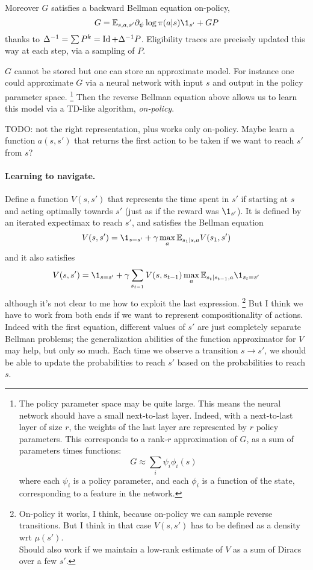 \documentclass[11pt,a4paper]{article}
\begin{document}
Moreover $G$ satisfies a backward Bellman equation on-policy,
\begin{equation}
G=\E_{s,a,s'} \partial_\psi \log \pi(a|s)\1_{s'}+GP
\end{equation}
thanks to $\Delta^{-1}=\sum P^k=\operatorname{Id}+\Delta^{-1}P$. Eligibility traces are
precisely
updated this way at each step, via a sampling of $P$.

$G$ cannot be stored but one can store an approximate model. For instance
one could approximate $G$ via a neural network with input $s$ and output
in the policy parameter space. \footnote{The policy parameter space may
be quite large. This means the neural network should have a small
next-to-last layer. Indeed, with a next-to-last layer of size $r$,
the weights of the last layer are represented by $r$ policy parameters.
This corresponds to a rank-$r$ approximation of $G$,
as a sum of parameters times functions:
\begin{equation}
G\approx \sum_i \psi_i \phi_i(s)
\end{equation}
where each $\psi_i$ is a policy parameter, and each $\phi_i$ is
a function of the state, corresponding to a feature in the network.} Then the reverse
Bellman equation above allows us to learn this model via
a TD-like algorithm, \emph{on-policy}.

TODO: not the right representation, plus works only on-policy. Maybe learn a function $a(s,s')$ that
returns the first action to be taken if we want to reach $s'$ from $s$?

\paragraph{Learning to navigate.} Define a function $V(s,s')$ that
represents the time spent in $s'$ if starting at $s$ and acting optimally
towards $s'$ (just as if the reward was $\1_{s'}$). It is defined by an iterated expectimax to reach $s'$, and
satisfies the Bellman equation
\begin{equation}
V(s,s')=\1_{s=s'}+\gamma \max_a \E_{s_1|s,a} V(s_1,s')
\end{equation}
and it also satisfies
\begin{equation}
V(s,s')=\1_{s=s'}+\gamma \sum_{s_{t-1}} V(s,s_{t-1})\max_a
\E_{s_t|s_{t-1},a}\1_{s_t=s'}
\end{equation}
although it's not clear to me how to exploit the last expression. 
\footnote{On-policy it works, I think, because on-policy we can sample
reverse transitions. But I think in that case $V(s,s')$ has to be defined
as a density wrt $\mu(s')$.\\Should also work if we maintain a low-rank
estimate of $V$ as a sum of Diracs over a few $s'$.}
But I
think we have to work from both ends if we want to represent
compositionality of actions. Indeed with the first equation, different values
of $s'$ are just completely separate Bellman problems; the generalization
abilities of the function approximator for $V$ may help, but only so
much. Each time we observe a transition $s\to s'$, we should be able to
update the probabilities to reach $s'$ based on the probabilities to
reach $s$.
\end{document}
